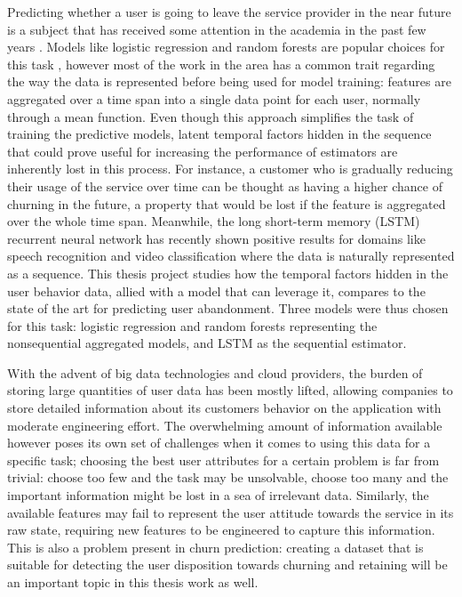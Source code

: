\documentclass{kththesis}
\begin{document}
	Predicting whether a user is going to leave the service provider in the near future is a subject that has received some attention in the academia in the past few years \citep{Pudipeddi2014}\citep{GurAli2014}\citep{Drachen2016RapidPO}. Models like logistic regression and random forests are popular choices for this task \citep{mahajan2015review}, however most of the work in the area has a common trait regarding the way the data is represented before being used for model training: features are aggregated over a time span into a single data point for each user, normally through a mean function. Even though this approach simplifies the task of training the predictive models, latent temporal factors hidden in the sequence that could prove useful for increasing the performance of estimators are inherently lost in this process. For instance, a customer who is gradually reducing their usage of the service over time can be thought as having a higher chance of churning in the future, a property that would be lost if the feature is aggregated over the whole time span. Meanwhile, the long short-term memory (LSTM) recurrent neural network has recently shown positive results for domains like speech recognition \citep{graves2013speech} and video classification \citep{yue2015beyond} where the data is naturally represented as a sequence. This thesis project studies how the temporal factors hidden in the user behavior data, allied with a model that can leverage it, compares to the state of the art for predicting user abandonment. Three models were thus chosen for this task: logistic regression and random forests representing the nonsequential aggregated models, and LSTM as the sequential estimator.	
	
	With the advent of big data technologies and cloud providers, the burden of storing large quantities of user data has been mostly lifted, allowing companies to store detailed information about its customers behavior on the application with moderate engineering effort. The overwhelming amount of information available however poses its own set of challenges when it comes to using this data for a specific task; choosing the best user attributes for a certain problem is far from trivial: choose too few and the task may be unsolvable, choose too many and the important information might be lost in a sea of irrelevant data. Similarly, the available features may fail to represent the user attitude towards the service in its raw state, requiring  new features to be engineered to capture this information. This is also a problem present in churn prediction: creating a dataset that is suitable for detecting the user disposition towards churning and retaining will be an important topic in this thesis work as well.
	
\end{document}
